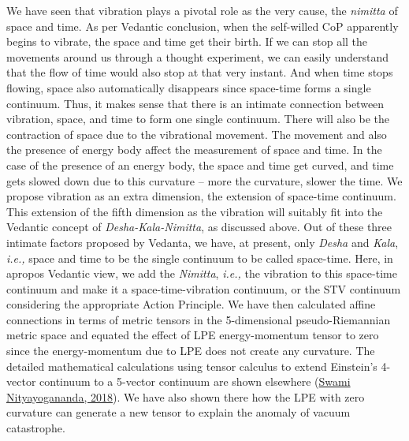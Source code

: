\documentclass[twoside, 13pt]{article}
\begin{document}
{{\fontsize{12}{14}\selectfont We have seen that vibration plays a pivotal role as the very cause, the \textit{nimitta} of space and time. As per Vedantic conclusion, when the self-willed CoP apparently begins to vibrate, the space and time get their birth. If we can stop all the movements around us through a thought experiment, we can easily understand that the flow of time would also stop at that very instant. And when time stops flowing, space also automatically disappears since space-time forms a single continuum. Thus, it makes sense that there is an intimate connection between vibration, space,  and time to form one single continuum. There will also be the contraction of space due to the vibrational movement. The movement and also the presence of energy body affect the measurement of space and time. In the case of the presence of an energy body, the space and time get curved, and time gets slowed down due to this curvature – more the curvature, slower the time. We propose vibration as an extra dimension, the extension of space-time continuum. This extension of the fifth dimension as the vibration will suitably fit into the Vedantic concept of \textit{Desha-Kala-Nimitta}, as discussed above. Out of these three intimate factors proposed by Vedanta, we have, at present, only \textit{Desha} and \textit{Kala}, {\it i.e.,} space and time to be the single continuum to be called space-time. Here, in apropos Vedantic view, we add the \textit{Nimitta}, {\it i.e.,} the vibration to this space-time continuum and make it a space-time-vibration continuum, or the STV continuum considering the appropriate Action Principle. We have then calculated affine connections in terms of metric tensors in the 5-dimensional pseudo-Riemannian metric space and equated the effect of LPE energy-momentum tensor to zero since the energy-momentum due to LPE does not create any curvature. The detailed mathematical calculations using tensor calculus to extend Einstein’s 4-vector continuum to a 5-vector continuum are shown elsewhere (\underline{Swami Nityayogananda, 2018}). We have also shown there how the LPE with zero curvature can generate a new tensor to explain the anomaly of vacuum catastrophe.}


}
\end{document}
